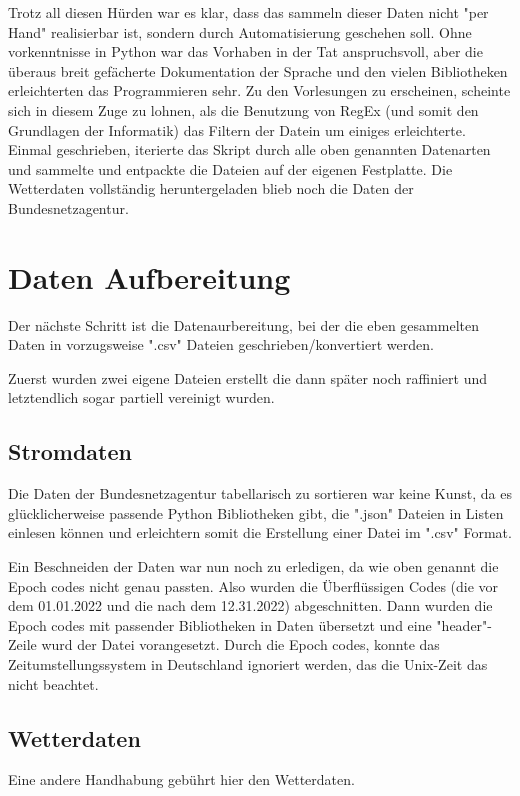 \documentclass[letterpaper]{article} %
\begin{document}
        Trotz all diesen Hürden war es klar, dass das sammeln dieser Daten nicht "per Hand" realisierbar ist, sondern durch Automatisierung geschehen soll. Ohne vorkenntnisse in Python war das Vorhaben in der Tat anspruchsvoll, aber die überaus breit gefächerte Dokumentation der Sprache und den vielen Bibliotheken erleichterten das Programmieren sehr.
        Zu den Vorlesungen zu erscheinen, scheinte sich in diesem Zuge zu lohnen, als die Benutzung von RegEx (und somit den Grundlagen der Informatik) das Filtern der Datein um einiges erleichterte. Einmal geschrieben, iterierte das Skript durch alle oben genannten Datenarten und sammelte und entpackte die Dateien auf der eigenen Festplatte. 
        Die Wetterdaten vollständig heruntergeladen blieb noch die Daten der Bundesnetzagentur.



\section*{Daten Aufbereitung}
    Der nächste Schritt ist die Datenaurbereitung, bei der die eben gesammelten Daten in vorzugsweise ".csv" Dateien geschrieben/konvertiert werden.

    Zuerst wurden zwei eigene Dateien erstellt die dann später noch raffiniert und letztendlich sogar partiell vereinigt wurden.

    \subsection*{Stromdaten}
        Die Daten der Bundesnetzagentur tabellarisch zu sortieren war keine Kunst, da es glücklicherweise passende Python Bibliotheken gibt, die ".json" Dateien in Listen einlesen können und erleichtern somit die Erstellung einer Datei im ".csv" Format.
        
        Ein Beschneiden der Daten war nun noch zu erledigen, da wie oben genannt die Epoch codes nicht genau passten. Also wurden die Überflüssigen Codes (die vor dem 01.01.2022 und die nach dem 12.31.2022) abgeschnitten. Dann wurden die Epoch codes mit passender Bibliotheken in Daten übersetzt und eine "header"-Zeile wurd der Datei vorangesetzt. Durch die Epoch codes, konnte das Zeitumstellungssystem in Deutschland ignoriert werden, das die Unix-Zeit das nicht beachtet.
    \subsection*{Wetterdaten}
        Eine andere Handhabung gebührt hier den Wetterdaten.
\end{document}
